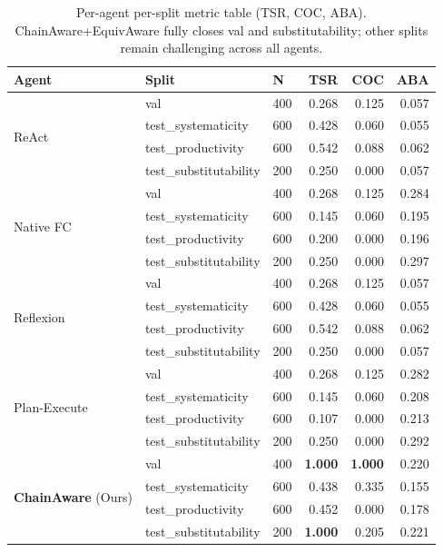 \documentclass[10pt]{article}
\begin{document}
\begin{table}[h]
    \centering
    \small
    \begin{tabular}{lllrrr}
        \toprule
        Agent & Split & N & TSR & COC & ABA \\
        \midrule
        \multirow{4}{*}{ReAct}
            & val                       & 400 & 0.268 & 0.125 & 0.057 \\
            & test\_systematicity       & 600 & 0.428 & 0.060 & 0.055 \\
            & test\_productivity        & 600 & 0.542 & 0.088 & 0.062 \\
            & test\_substitutability    & 200 & 0.250 & 0.000 & 0.057 \\
        \midrule
        \multirow{4}{*}{Native FC}
            & val                       & 400 & 0.268 & 0.125 & 0.284 \\
            & test\_systematicity       & 600 & 0.145 & 0.060 & 0.195 \\
            & test\_productivity        & 600 & 0.200 & 0.000 & 0.196 \\
            & test\_substitutability    & 200 & 0.250 & 0.000 & 0.297 \\
        \midrule
        \multirow{4}{*}{Reflexion}
            & val                       & 400 & 0.268 & 0.125 & 0.057 \\
            & test\_systematicity       & 600 & 0.428 & 0.060 & 0.055 \\
            & test\_productivity        & 600 & 0.542 & 0.088 & 0.062 \\
            & test\_substitutability    & 200 & 0.250 & 0.000 & 0.057 \\
        \midrule
        \multirow{4}{*}{Plan-Execute}
            & val                       & 400 & 0.268 & 0.125 & 0.282 \\
            & test\_systematicity       & 600 & 0.145 & 0.060 & 0.208 \\
            & test\_productivity        & 600 & 0.107 & 0.000 & 0.213 \\
            & test\_substitutability    & 200 & 0.250 & 0.000 & 0.292 \\
        \midrule
        \multirow{4}{*}{\textbf{ChainAware} (Ours)}
            & val                       & 400 & \textbf{1.000} & \textbf{1.000} & 0.220 \\
            & test\_systematicity       & 600 & 0.438 & 0.335 & 0.155 \\
            & test\_productivity        & 600 & 0.452 & 0.000 & 0.178 \\
            & test\_substitutability    & 200 & \textbf{1.000} & 0.205 & 0.221 \\
        \bottomrule
    \end{tabular}
    \caption{Per-agent per-split metric table (TSR, COC, ABA). ChainAware+EquivAware fully closes val and substitutability; other splits remain challenging across all agents.}
    \label{tab:full-metrics}
\end{table}
\end{document}

